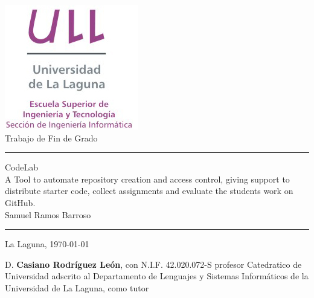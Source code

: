 \documentclass[spanish,a4paper,14pt,oneside]{extreport}
\begin{document}

\pagestyle{empty}
\thispagestyle{empty}


\newcommand{\HRule}{\rule{\linewidth}{1mm}}
\setlength{\parindent}{0mm}
\setlength{\parskip}{2.5mm}


\begin{center}
\includegraphics[scale=0.8]{images/logo_vertical}\\[10mm]
{\Huge Trabajo de Fin de Grado}
\end{center}

\HRule
\begin{flushright}
        {\Huge CodeLab} \\[2.5mm]
        {\Large A Tool to automate repository creation and access control, giving support to distribute starter code, collect assignments and evaluate the students work on GitHub.} \\[5mm]
        {\Large Samuel Ramos Barroso} \\[5mm]


\end{flushright}
\HRule
{}
\begin{center}
  \Large La Laguna, \today
\end{center}

\setlength{\parindent}{5mm}

\newpage
\thispagestyle{empty}

D. {\bf Casiano Rodríguez León}, con N.I.F. 42.020.072-S profesor Catedratico de Universidad adscrito al Departamento de Lenguajes y Sistemas Informáticos de la Universidad de La Laguna, como tutor
\end{document}
